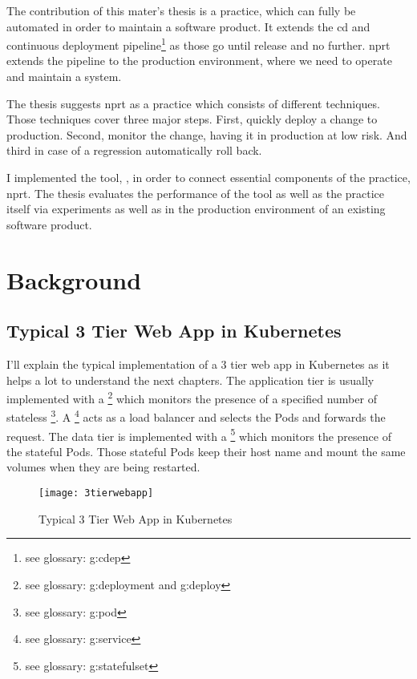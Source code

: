 The contribution of this mater's thesis is a practice, which can fully be automated in
order to maintain a software product. It extends the \gls{cd} and continuous deployment
pipeline\footnote{see glossary: \gls{g:cdep}} as those go until release and no
further. \gls{nprt} extends the pipeline to the production environment, where we need to
operate and maintain a system.

The thesis suggests \gls{nprt} as a practice which consists of different techniques. Those
techniques cover three major steps. First, quickly deploy a change to production. Second,
monitor the change, having it in production at low risk. And third in case of a regression
automatically roll back.

I implemented the tool, \deployer, in order to connect essential components of the
practice, \gls{nprt}. The thesis evaluates the performance of the tool as well as the
practice itself via experiments as well as in the production environment of an existing
software product.

\chapter{Background}
\label{chap:background}

\section{Typical 3 Tier Web App in Kubernetes}

I'll explain the typical implementation of a 3 tier web app in Kubernetes as it helps a
lot to understand the next chapters. The application tier is usually implemented with a
\footnote{see glossary: \gls{g:deployment} and \gls{g:deploy}} which
monitors the presence of a specified number of stateless \footnote{see
  glossary: \gls{g:pod}}. A \footnote{see glossary: \gls{g:service}} acts as
a load balancer and selects the Pods and forwards the request. The data tier is
implemented with a \footnote{see glossary: \gls{g:statefulset}} which
monitors the presence of the stateful Pods. Those stateful Pods keep their host name and
mount the same volumes when they are being restarted.

\begin{figure}[htbp]
  \centering
  \texttt{[image: 3tierwebapp]}
  \caption{Typical 3 Tier Web App in Kubernetes}
  \label{fig:3tierwebapp}
\end{figure}

